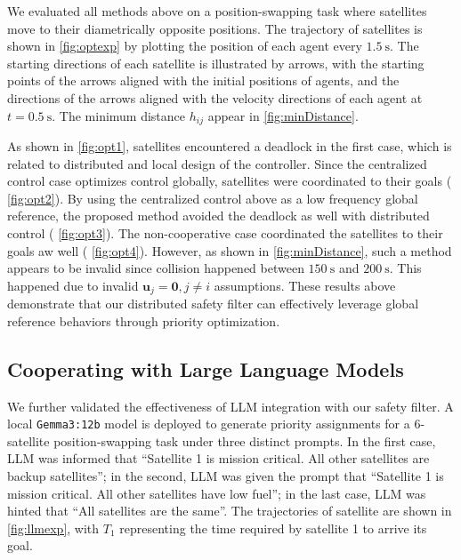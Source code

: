 \documentclass{ifacconf}
\begin{document}
\par We evaluated all methods above on a position-swapping task where satellites move to their diametrically opposite positions. The trajectory of satellites is shown in {\figurename} \ref{fig:optexp} by plotting the position of each agent every $1.5~\mathrm{s}$. The starting directions of each satellite is illustrated by arrows, with the starting points of the arrows aligned with the initial positions of agents, and the directions of the arrows aligned with the velocity directions of each agent at $t = 0.5~\mathrm{s}$.
The minimum distance $h_{ij}$ appear in {\figurename} \ref{fig:minDistance}.

\par As shown in {\figurename} \ref{fig:opt1}, satellites encountered a deadlock in the first case, which is related to distributed and local design of the controller.
Since the centralized control case optimizes control globally, satellites were coordinated to their goals ({\figurename} \ref{fig:opt2}).
By using the centralized control above as a low frequency global reference, the proposed method avoided the deadlock as well with distributed control ({\figurename} \ref{fig:opt3}).
The non-cooperative case coordinated the satellites to their goals aw well ({\figurename} \ref{fig:opt4}). 
However, as shown in {\figurename} \ref{fig:minDistance}, such a method appears to be invalid since collision happened between $150~\mathrm{s}$ and $200~\mathrm{s}$.
This happened due to invalid $\boldsymbol{u}_j = \boldsymbol{0}, j \neq i$ assumptions.
These results above demonstrate that our distributed safety filter can effectively leverage global reference behaviors through priority optimization.

\subsection{Cooperating with Large Language Models}
\par We further validated the effectiveness of LLM integration with our safety filter. A local \texttt{Gemma3:12b} \cite[]{gemma2024} model is deployed to generate priority assignments for a 6-satellite position-swapping task under three distinct prompts. 
In the first case, LLM was informed that ``Satellite 1 is mission critical. All other satellites are backup satellites''; 
in the second, LLM was given the prompt that ``Satellite 1 is mission critical. All other satellites have low fuel'';
in the last case, LLM was hinted that ``All satellites are the same''.
The trajectories of satellite are shown in {\figurename} \ref{fig:llmexp}, with $T_1$ representing the time required by satellite 1 to arrive its goal.
\end{document}
